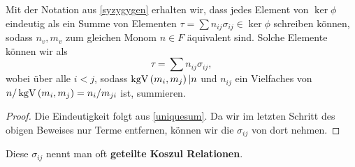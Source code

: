\documentclass{article}
\begin{document}
	\begin{lem}
		Mit der Notation aus \ref{syzygygen} erhalten wir,
		dass jedes Element von 
		\( \ker \phi \)
		eindeutig als ein Summe von Elementen 
		\( \tau = \sum n_{ij} \sigma_{ij} \in \ker \phi\)
		schreiben k\"onnen, 
		sodass 
		\( n_{v}, m_{v} \)
		zum gleichen Monom 
		\( n\in F \)
		\"aquivalent sind.
		Solche Elemente k\"onnen wir als
		\[ 
			\tau = \sum n_{ij} \sigma_{ij} ,
		\]
		wobei \"uber alle 
		\( i<j \), 
		sodass 
		\( \operatorname{kgV} \left( m_{i},m_{j} \right)  | n \)
		und
		\( n_{ij} \)
		ein Vielfaches von 
		\( n/ \operatorname{kgV}\left( m_{i},m_{j} \right)
		=n_{i} / m_{ji}\)
		ist,
		summieren.
		\begin{proof}
			Die Eindeutigkeit folgt aus \ref{uniquesum}.
			Da wir im letzten Schritt des obigen Beweises nur Terme entfernen,
			k\"onnen wir die 
			\(\sigma_{ij} \) 
			von dort nehmen.
		\end{proof}
	\end{lem}
	Diese 
	\( \sigma_{ij}\)
	nennt man oft 
	\textbf{geteilte Koszul Relationen}.
\end{document}
